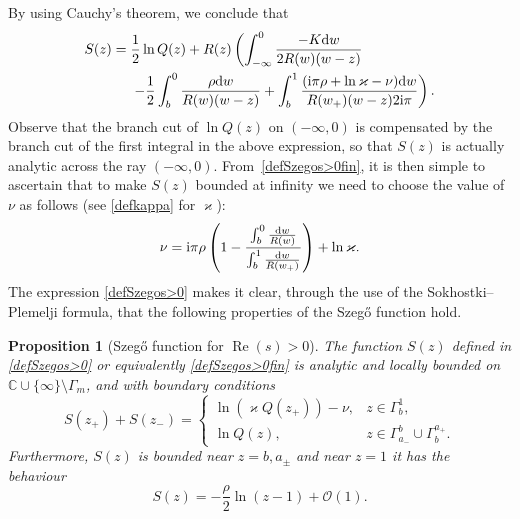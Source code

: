 \documentclass[10pt,a4paper]{amsart}
\numberwithin{equation}{section}
\newtheorem{Proposition}[Theorem]{Proposition}
\theoremstyle{definition}
\def\le{\left}
\def\ri{\right}
\def \d{{\mathrm d}}
\def\be{\begin{equation}}
\def\ee{\end{equation}}
\def\C{{\mathbb C}}
\def \Re{\operatorname{Re} }
\begin{document}
By using Cauchy's theorem, we conclude that
\begin{align}
S(z)
={}&\frac 1 2\ln Q(z)+ R(z) \left( \int_{-\infty}^0 \frac { -{K}\d w}{2R(w)(w-z)}\right. \nonumber\\
&\left.-\frac 1 2 \int_b^0 \frac {{ {\rho}} \d w}{R(w)(w-z)}
+\int_b^1 \frac {({\rm i}\pi { {\rho}} + \ln \varkappa -\nu) \d w}{R(w_+)(w-z)2{\rm i}\pi}
\right).
\label{defSzegos>0fin}
\end{align}
Observe that the branch cut of $\ln Q(z)$ on $(-\infty,0)$ is compensated by the branch cut of the first integral in the above expression, so that $S(z)$ is actually analytic across the ray $(-\infty,0)$.
From~\eqref{defSzegos>0fin}, it is then simple to ascertain that to make $S(z)$ bounded at infinity we need to choose the value of $\nu$ as follows (see \eqref{defkappa} for $\varkappa$):
\be
\label{defnus>0}
\nu = {\rm i}\pi { {\rho}}\le(1- \frac {\int_b^0 \frac {\d w}{R(w)}}{\int_{b}^1 \frac {\d w}{R(w_+)}} \ri) + \ln \varkappa.
\ee
The expression \eqref{defSzegos>0} makes it clear, through the use of the Sokhostki--Plemelji formula, that the following properties of the Szeg\H{o} function hold.

\begin{Proposition}[Szeg\H{o} function for $\Re(s)>0$]
\label{propSzegos>0}
The function $S(z)$ defined in \eqref{defSzegos>0} or equivalently \eqref{defSzegos>0fin} is analytic and locally bounded on $\C\cup \{\infty\}\setminus \Gamma_m$, and with boundary conditions
\[
S(z_+)+ S(z_-) =
\begin{cases}
\ln \le(\varkappa Q(z_+)\ri) - \nu, & z\in \Gamma_b^1,\\
\ln Q(z), & z\in \Gamma_{a_-}^b \cup \Gamma_b^{a_+}.
\end{cases}
\]
Furthermore, $S(z)$ is bounded near $z=b,a_\pm$ and near $z=1$ it has the behaviour {\rm\cite[\emph{Chapter}~5]{Gakhov}}
\[
S(z) = -\frac { {\rho}} 2\ln(z-1) + \mathcal O(1).
\]
\end{Proposition}
\end{document}
